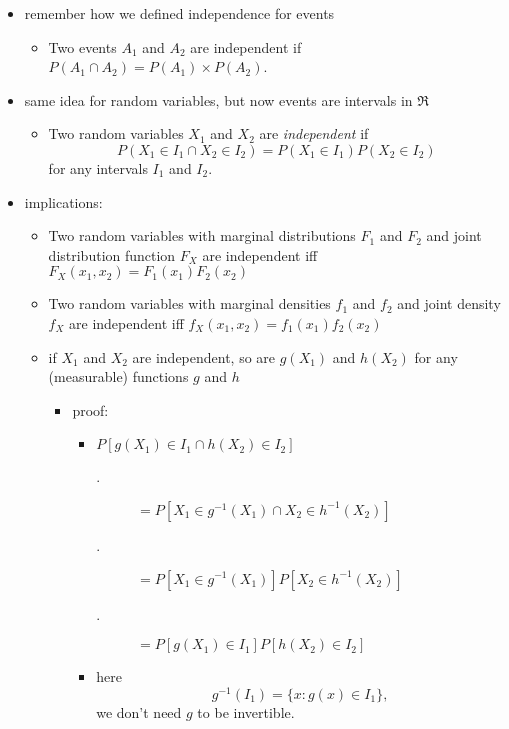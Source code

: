 \begin{itemize}
\item remember how we defined independence for events
\begin{itemize}
\item Two events $A_1$ and $A_2$ are independent if $P(A_1 \cap
         A_2) = P(A_1) \times P(A_2)$.
\end{itemize}
\item same idea for random variables, but now events are intervals in $\Re$
\begin{itemize}
\item Two random variables $X_1$ and $X_2$ are \emph{independent} if \[
         P(X_1 \in I_1 \cap X_2 \in I_2) = P(X_1 \in I_1) P(X_2 \in
         I_2)\] for any intervals $I_1$ and $I_2$.
\end{itemize}
\item implications:
\begin{itemize}
\item Two random variables with marginal distributions $F_1$ and
         $F_2$ and joint distribution function $F_X$ are independent iff
         $F_X(x_1, x_2) = F_1(x_1) F_2(x_2)$
\item Two random variables with marginal densities $f_1$ and $f_2$
         and joint density $f_X$ are independent iff 
         $f_X(x_1,x_2) = f_1(x_1) f_2(x_2)$
\item if $X_1$ and $X_2$ are independent, so are $g(X_1)$ and
         $h(X_2)$ for any (measurable) functions $g$ and $h$
\begin{itemize}
\item proof:
\begin{itemize}
\item $P[g(X_1) \in I_1 \cap h(X_2) \in I_2]$
\begin{description}
\item[.] $= P[X_1 \in g^{-1}(X_1) \cap X_2 \in h^{-1}(X_2)]$
\item[.] $= P[X_1 \in g^{-1}(X_1)] P[X_2 \in h^{-1}(X_2)]$
\item[.] $= P[g(X_1) \in I_1] P[h(X_2) \in I_2]$
\end{description}
\item here \[g^{-1}(I_1) = \{x : g(x) \in I_1\},\] we don't
             need $g$ to be invertible.
\end{itemize}
\end{itemize}
\end{itemize}
\end{itemize}

